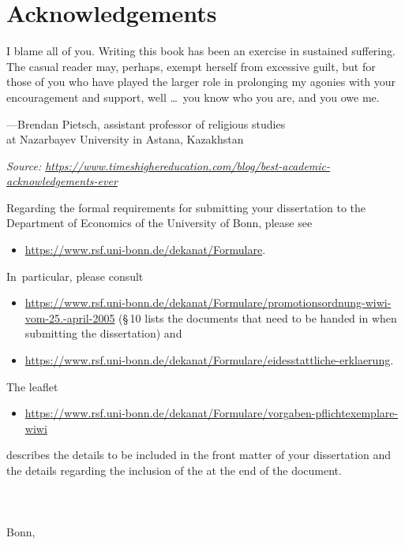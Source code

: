 \chapter{Acknowledgements}


I blame all of you. Writing this book has been an exercise in sustained suffering. The casual reader may, perhaps, exempt herself from excessive guilt, but for those of you who have played the larger role in prolonging my agonies with your encouragement and support, well \dots\ you know who you are, and you owe me.%

\RaggedLeft
---Brendan Pietsch, assistant professor of religious studies \\
at Nazarbayev University in Astana, Kazakhstan

\medskip

\textit{Source: \url{https://www.timeshighereducation.com/blog/best-academic-acknowledgements-ever}}

\justifying

\bigskip

\noindent%
Regarding the formal requirements for submitting your dissertation to the Department of Economics of the University of Bonn, please see
\begin{itemize}
	\item \url{https://www.rsf.uni-bonn.de/dekanat/Formulare}.
\end{itemize}  In~particular, please consult
\begin{itemize}
	\item \url{https://www.rsf.uni-bonn.de/dekanat/Formulare/promotionsordnung-wiwi-vom-25.-april-2005} (\S\,10 lists the documents that need to be handed in when submitting the dissertation) and
	\item \url{https://www.rsf.uni-bonn.de/dekanat/Formulare/eidesstattliche-erklaerung}.
\end{itemize}
The leaflet
\begin{itemize}
	\item \url{https://www.rsf.uni-bonn.de/dekanat/Formulare/vorgaben-pflichtexemplare-wiwi}
\end{itemize}
describes the details to be included in the front matter of your dissertation and the details regarding the inclusion of the  at the end of the document.
\\
\\
\\
\dissauthor \\
Bonn, \disssubmitdate
